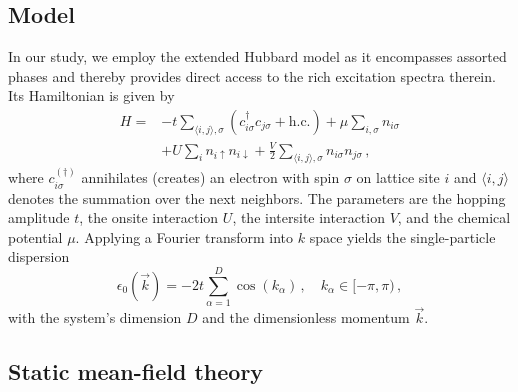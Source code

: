 \documentclass[
    reprint, 
    aps,
    preprintnumbers,
    twocolumn,
    prb,
    superscriptaddress
]{revtex4-2}
\newcommand{\vk}{\vec{k}}
\begin{document}
\subsection{Model}

In our study, we employ the extended Hubbard model as it encompasses assorted phases and thereby provides direct access to the rich excitation spectra therein.
Its Hamiltonian is given by
\begin{equation}
    \label{eqn:full_hamiltonian}
    \begin{aligned}
        H = &-t \sum_{\langle i, j \rangle, \sigma} \left( c_{i\sigma}^\dagger c_{j\sigma} + \text{h.c.} \right) 
        + \mu \sum_{i,\sigma} n_{i\sigma} \\
        &+ U \sum_{i} n_{i\uparrow} n_{i\downarrow} 
        + \frac{V}{2} \sum_{\langle i, j\rangle, \sigma} n_{i\sigma} n_{j\sigma}\,,
    \end{aligned}
\end{equation}
where $c_{i\sigma}^{(\dagger)}$ annihilates (creates) an electron with spin $\sigma$ on lattice site $i$ 
and $\langle i, j\rangle$ denotes the summation over the next neighbors.
The parameters are the hopping amplitude $t$, the onsite interaction $U$, the intersite interaction $V$, and the chemical potential $\mu$.
Applying a Fourier transform into $k$ space yields the single-particle dispersion 
\begin{equation}
    \epsilon_0 (\vk) = -2t \sum_{\alpha=1}^D \cos(k_\alpha)\,,\quad k_\alpha \in [-\pi, \pi)\,,
\end{equation}
with the system's dimension $D$ and the dimensionless momentum $\vk$.

\subsection{Static mean-field theory}
\end{document}
